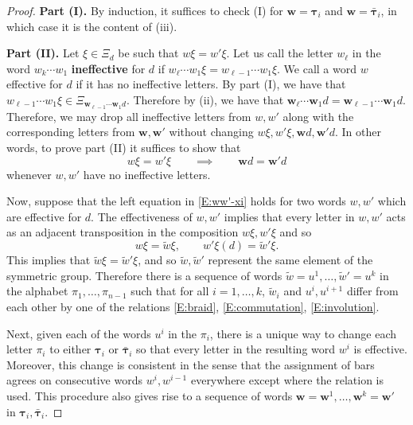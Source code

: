 \documentclass[11pt]{article}
\newcommand{\bw}{\mathbf{w}}
\theoremstyle{definition} %
\theoremstyle{remark} %
\newcommand{\btau}{{\boldsymbol \tau}}
\newcommand{\bbtau}{\bar {\boldsymbol \tau}}
\begin{document}
\begin{proof}
	\textbf{Part (I).} \qquad 
	By induction, it suffices to check (I) for $\mathbf w=\btau_i$ and $\mathbf w=\bbtau_i$, in which case it is the content of (iii).
	
	\textbf{Part (II).} \qquad Let $\xi \in \Xi_d$ be such that $w \xi = w' \xi$. Let us call the letter $w_\ell$ in the word $w_k\cdots w_1$ {\bf ineffective} for $d$ if $w_\ell \cdots w_1\xi =w_{\ell - 1} \cdots w_1 \xi$. We call a word $w$ effective for $d$ if it has no ineffective letters. By part (I), we have that
	$w_{\ell-1}\cdots w_1 \xi \in \Xi_{\bw_{\ell-1} \cdots \bw_1 d}$. Therefore by (ii), we have that $\bw_{\ell} \cdots \bw_1 d = \bw_{\ell-1} \cdots \bw_1 d$. Therefore, we may drop all ineffective letters from $w, w'$ along with the corresponding letters from $\bw, \bw'$ without changing $w \xi, w' \xi, \bw d, \bw' d$. In other words, to prove part (II) it suffices to show that 
	\begin{equation}
		\label{E:ww'-xi}
		w \xi = w' \xi \qquad \implies \qquad \bw d = \bw' d
	\end{equation}
	whenever $w, w'$ have no ineffective letters.
	
	Now, suppose that the left equation in \eqref{E:ww'-xi} holds for two words $w, w'$ which are effective for $d$. The effectiveness of $w, w'$ implies that every letter in $w, w'$ acts as an adjacent transposition in the composition $w \xi, w' \xi$ and so
	$$
	w \xi = \tilde w \xi, \qquad w' \xi (d) = \tilde w' \xi.
	$$
	This implies that $\tilde w \xi = \tilde w' \xi$, and so $\tilde w, \tilde w'$ represent the same element of the symmetric group. Therefore there is a sequence of words $\tilde w = u^1, \dots, \tilde w' = u^k$ in the alphabet $\pi_1, \dots, \pi_{n-1}$ such that for all $i = 1, \dots, k$, $\tilde w_i$ and $u^i, u^{i+1}$ differ from each other by one of the relations \eqref{E:braid}, \eqref{E:commutation}, \eqref{E:involution}.
	
	Next, given each of the words $u^i$ in the $\pi_i$, there is a unique way to change each letter $\pi_i$ to either $\btau_i$ or $\bbtau_i$ so that every letter in the resulting word $w^i$ is effective. Moreover, this change is consistent in the sense that the assignment of bars agrees on consecutive words $w^i, w^{i-1}$ everywhere except where the relation is used.
	This procedure also gives rise to a sequence of words $\bw = \bw^1, \dots, \bw^k= \bw'$ in $\btau_i, \bbtau_i$.
	

\end{proof}
\end{document}
